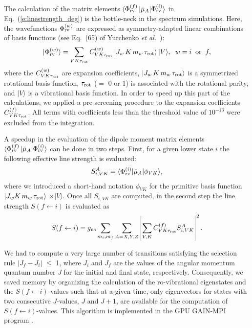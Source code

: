 \documentclass{achemso}
\renewcommand{\eqref}[1]{(\ref{#1})}
\newcommand{\red}[1]{{\color{red} #1}}
\newcommand{\3}{$_{3}$}
\begin{document}
The calculation of the matrix elements
$\langle \Phi_{\rm rv}^{(f)} \, \vert \bar\mu_A \vert \Phi_{\rm
rv}^{(i)} \rangle$ in Eq.~\eqref{e:linestrength_deg} is the
bottle-neck in the spectrum simulations. Here, the wavefunctions $\Phi_{\rm rv}^{(w)} $
are expressed as symmetry-adapted linear combinations of basis functions (see
Eq.~(65) of Yurchenko \textit{et al.}~\cite{trove17a}):
\begin{equation}
\label{e:rovib:basis}
\vert \Phi_{\rm rv}^{(w)} \rangle =
\sum_{V K \tau_{\rm rot}}
C_{V K \tau_{\rm rot}}^{(w)} \,
\vert J_w \, K \, m_w\, \tau_{\rm rot}  \rangle \, | V \rangle,
\;\; w = i \;\; {\rm or} \;\; f,
\end{equation}
where the $C_{V K \tau_{\rm rot}}^{(w)}$ are expansion coefficients,
$\vert J_w \, K \, m_w\, \tau_{\rm rot} \rangle$ is a
symmetrized rotational basis function, $\tau_{\rm rot}$ ($=$ 0
or 1) is associated with the rotational parity, and $\vert V \rangle$ is a vibrational basis function.
In order to speed up this part of the calculations, we applied
a pre-screening procedure to the expansion coefficients $C_{V
K \tau_{\rm rot}}^{(f)}$.
All
terms with coefficients less than the threshold value of
$10^{-13}$ were excluded from the integration.


A speedup
in the evaluation of the dipole moment
matrix elements $\langle \Phi_{\rm rv}^{(f)} \, \vert \bar\mu_A
\vert \Phi_{\rm rv}^{(i)} \rangle$ can be done
in two steps. First, for a given lower state $i$
the following effective line strength is evaluated:
\begin{equation}\label{e:effective:Sif}
S_{i,V K}^{A} = \langle \Phi_{\rm rv}^{(i)} \vert \bar\mu_{A} \vert \phi_{V K} \rangle,
\end{equation}
where we introduced a short-hand notation $\phi_{V K}$ for the
primitive basis function $\vert J_w K \, m_w\, \tau_{\rm rot}
\rangle$ $\times \vert V \rangle $. Once all $S_{i,V K}$ are computed,
in the second step the line strength $S(f \leftarrow i)$ is
evaluated as
\begin{equation}\label{e:effective:Sif:2nd:step}
S(f \leftarrow i)= g_{\rm ns} \sum_{m_i, m_f}\sum_{A=X,Y,Z} \left\vert  \sum_{V, K} C_{V K \tau_{\rm rot}}^{(f)} S_{i, V K}^A \right\vert^2.
\end{equation}

We had to compute a very large number of transitions satisfying the selection rule
$\vert J_{f} - J_i \vert$ $\leqslant$ 1, where
 $J_{i}$ and $J_f$ are the values of the angular momentum quantum number  $J$ for the initial and final state, respectively. Consequently, we saved memory by organizing the calculation of the ro-vibrational eigenstates and the $S(f\leftarrow i)$-values such that at a given time, only eigenvectors for states with two consecutive $J$-values,  $J$ and $J+1$, are available for the computation of $S(f\leftarrow i)$-values. This algorithm is  implemented in the  GPU GAIN-MPI program \citep{17AlYuTe}.
 
\end{document}
